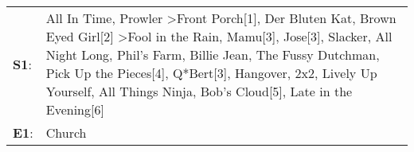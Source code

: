 \begin{supertabular}{p{0.03\textwidth}p{0.92\textwidth}}
 \textbf{S1}:  &  All In Time\textsuperscript{}, \enspace Prowler\textsuperscript{} \textgreater \enspace Front Porch[1]\textsuperscript{}, \enspace Der Bluten Kat\textsuperscript{}, \enspace Brown Eyed Girl[2]\textsuperscript{} \textgreater \enspace Fool in the Rain\textsuperscript{}, \enspace Mamu[3]\textsuperscript{}, \enspace Jose[3]\textsuperscript{}, \enspace Slacker\textsuperscript{}, \enspace All Night Long\textsuperscript{}, \enspace Phil's Farm\textsuperscript{}, \enspace Billie Jean\textsuperscript{}, \enspace The Fussy Dutchman\textsuperscript{}, \enspace Pick Up the Pieces[4]\textsuperscript{}, \enspace Q*Bert[3]\textsuperscript{}, \enspace Hangover\textsuperscript{}, \enspace 2x2\textsuperscript{}, \enspace Lively Up Yourself\textsuperscript{}, \enspace All Things Ninja\textsuperscript{}, \enspace Bob's Cloud[5]\textsuperscript{}, \enspace Late in the Evening[6]\textsuperscript{}  \enspace  \\
 \textbf{E1}:  &                                                                                                                                                                                                                                                                                                                                                                                                                                                                                                                                                                                                                                                                                                                                                                                                                                                                                                  Church\textsuperscript{}  \enspace  \\
\end{supertabular}
